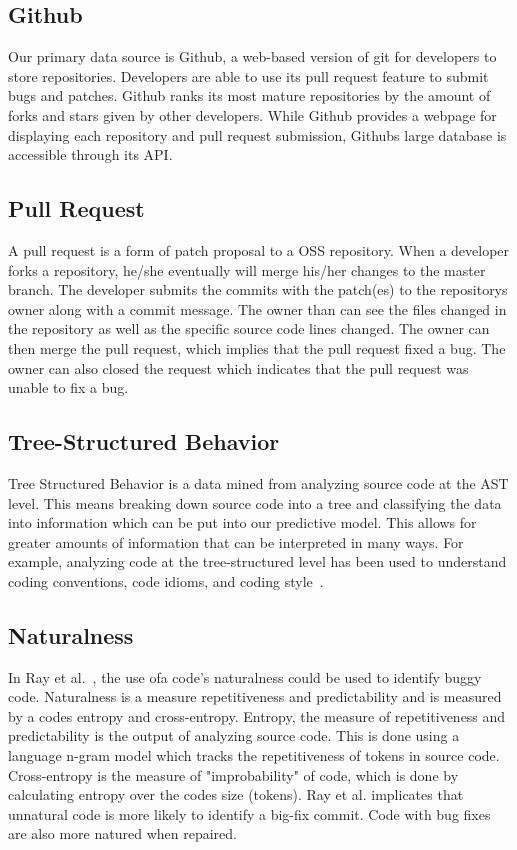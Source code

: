 \documentclass[10pt, conference]{IEEEtran}
\begin{document}
\subsection{Github}
Our primary data source is Github, a web-based version of git for developers to store repositories. Developers are able to use its pull request feature to submit bugs and patches. Github ranks its most mature repositories by the amount of forks and stars given by other developers. While Github provides a webpage for displaying each repository and pull request submission, Github\textquotesingle s large database is accessible through its API. 

\subsection{Pull Request}
A pull request is a form of patch proposal to a OSS repository. When a developer forks a repository, he/she eventually will merge his/her changes to the master branch. The developer submits the commits with the patch(es) to the repository\textquotesingle s owner along with a commit message. The owner than can see the files changed in the repository as well as the specific source code lines changed. The owner can then merge the pull request, which implies that the pull request fixed a bug. The owner can also closed the request which indicates that the pull request was unable to fix a bug.

\subsection{Tree-Structured Behavior}
Tree Structured Behavior is a data mined from analyzing source code at the AST level. This means breaking down source code into a tree and classifying the data into information which can be put into our predictive model. This allows for greater amounts of information that can be interpreted in many ways. For example, analyzing code at the tree-structured level has been used to understand coding conventions, code idioms, and coding style~\cite{Allamanis:2014:LNC:2635868.2635883}.

\subsection{Naturalness}
In Ray et al.~\cite{Ray:2016:NBC:2884781.2884848}, the use ofa code's naturalness could be used to identify buggy code. Naturalness is a measure repetitiveness and predictability and is measured by a code\textquotesingle s entropy and cross-entropy. Entropy, the measure of repetitiveness and predictability is the output of analyzing source code. This is done using a language n-gram model which tracks the repetitiveness of tokens in source code. Cross-entropy is the measure of "improbability" of code, which is done by calculating entropy over the code\textquotesingle s size (tokens). Ray et al. implicates that unnatural code is more likely to identify a big-fix commit. Code with bug fixes are also more natured when repaired. 
\end{document}
